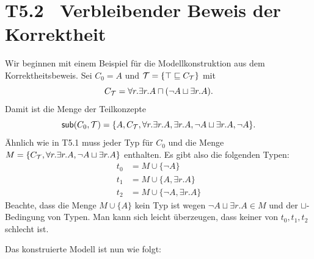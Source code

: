 \documentclass[fontsize=11pt, twoside=false, numbers=autoenddot]{scrbook}
\begin{document}
\pagebreak
\section*{T5.2~ Verbleibender Beweis der Korrektheit}

Wir beginnen mit einem Beispiel für die Modellkonstruktion aus dem
Korrektheitsbeweis. Sei $C_0=A$ und $\mathcal{T}=\{\top\sqsubseteq C_\mathcal{T}\}$
mit 
%
\[C_\mathcal{T} = \forall r.\exists r.A\sqcap (\neg A\sqcup \exists r.A).\]
%
Damit ist die Menge der Teilkonzepte 
%
\[\textsf{sub}(C_0,\mathcal{T})=\{A,C_\mathcal{T},\forall r.\exists r.A,\exists
r.A,\neg A\sqcup\exists r.A,\neg A\}.\]
%
Ähnlich wie in T5.1 muss jeder Typ für $C_0$ und \Tmc die Menge
$M=\{C_\mathcal{T},\forall r.\exists r.A,\neg A\sqcup \exists r.A\}$
enthalten. Es gibt also die folgenden Typen: 
%
\begin{align*}
  t_0 & = M\cup \{\neg A\} \\
  t_1 & = M\cup \{A,\exists r.A\} \\
  t_2 & = M\cup \{\neg A,\exists r.A\} 
\end{align*}
%
Beachte, dass die Menge $M\cup\{A\}$ kein Typ ist wegen $\neg
A\sqcup \exists r.A\in M$ und der $\sqcup$-Bedingung von Typen. Man
kann sich leicht überzeugen, dass keiner von $t_0,t_1,t_2$ schlecht
ist.

Das konstruierte Modell ist nun wie folgt: 
%
\begin{center}
\end{center}
%
\end{document}
